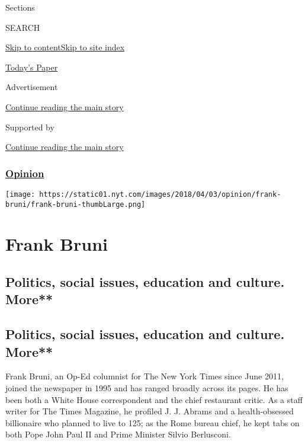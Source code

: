 Sections

SEARCH

\protect\hyperlink{site-content}{Skip to
content}\protect\hyperlink{site-index}{Skip to site index}

\href{https://myaccount.nytimes.com/auth/login?response_type=cookie\&client_id=vi}{}

\href{https://www.nytimes.com/section/todayspaper}{Today's Paper}

Advertisement

\protect\hyperlink{after-top}{Continue reading the main story}

Supported by

\protect\hyperlink{after-sponsor}{Continue reading the main story}

\hypertarget{opinion}{%
\subsubsection{\texorpdfstring{\href{/section/opinion}{Opinion}}{Opinion}}\label{opinion}}

\texttt{[image: https://static01.nyt.com/images/2018/04/03/opinion/frank-bruni/frank-bruni-thumbLarge.png]}

\hypertarget{frank-bruni}{%
\section{Frank Bruni}\label{frank-bruni}}

\hypertarget{politics-social-issues-education-and-culture-more}{%
\subsection{Politics, social issues, education and culture.
More**}\label{politics-social-issues-education-and-culture-more}}

\hypertarget{politics-social-issues-education-and-culture-more-1}{%
\subsection{Politics, social issues, education and culture.
More**}\label{politics-social-issues-education-and-culture-more-1}}

Frank Bruni, an Op-Ed columnist for The New York Times since June 2011,
joined the newspaper in 1995 and has ranged broadly across its pages. He
has been both a White House correspondent and the chief restaurant
critic. As a staff writer for The Times Magazine, he profiled J. J.
Abrams and a health-obsessed billionaire who planned to live to 125; as
the Rome bureau chief, he kept tabs on both Pope John Paul II and Prime
Minister Silvio Berlusconi.


